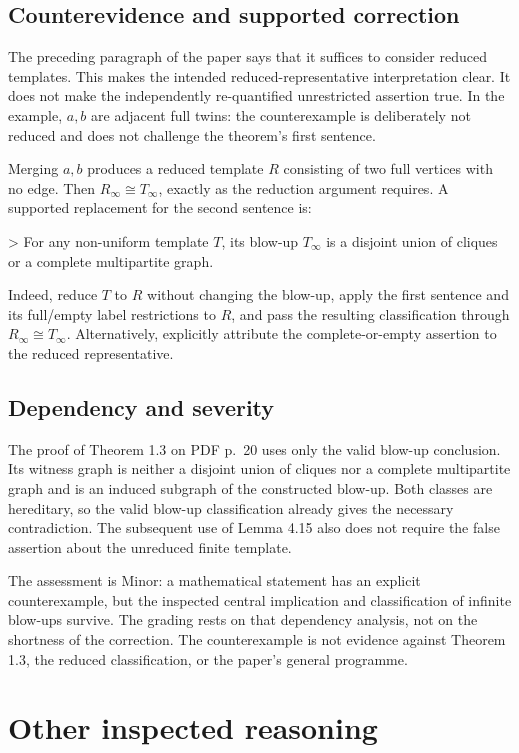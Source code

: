 \documentclass[10pt]{article}
\begin{document}
\subsection*{Counterevidence and supported correction}
The preceding paragraph of the paper says that it suffices to consider reduced templates. This makes the intended reduced-representative interpretation clear. It does not make the independently re-quantified unrestricted assertion true. In the example, \(a,b\) are adjacent full twins: the counterexample is deliberately not reduced and does not challenge the theorem’s first sentence.\par
Merging \(a,b\) produces a reduced template \(R\) consisting of two full vertices with no edge. Then \(R_\infty\cong T_\infty\), exactly as the reduction argument requires. A supported replacement for the second sentence is:\par
> For any non-uniform template \(T\), its blow-up \(T_\infty\) is a disjoint union of cliques or a complete multipartite graph.\par
Indeed, reduce \(T\) to \(R\) without changing the blow-up, apply the first sentence and its full/empty label restrictions to \(R\), and pass the resulting classification through \(R_\infty\cong T_\infty\). Alternatively, explicitly attribute the complete-or-empty assertion to the reduced representative.\par
\subsection*{Dependency and severity}
The proof of Theorem 1.3 on PDF p. 20 uses only the valid blow-up conclusion. Its witness graph is neither a disjoint union of cliques nor a complete multipartite graph and is an induced subgraph of the constructed blow-up. Both classes are hereditary, so the valid blow-up classification already gives the necessary contradiction. The subsequent use of Lemma 4.15 also does not require the false assertion about the unreduced finite template.\par
The assessment is Minor: a mathematical statement has an explicit counterexample, but the inspected central implication and classification of infinite blow-ups survive. The grading rests on that dependency analysis, not on the shortness of the correction. The counterexample is not evidence against Theorem 1.3, the reduced classification, or the paper’s general programme.\par
\section*{Other inspected reasoning}
\end{document}
